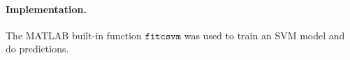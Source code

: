 





\paragraph{Implementation.}
The MATLAB built-in function $\mathtt{fitcsvm}$ was used to train an 
SVM model and do predictions. 



